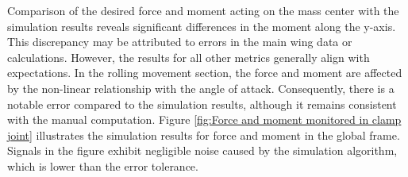 Comparison of the desired force and moment acting on the mass center with the simulation results reveals significant differences in the moment along the y-axis. This discrepancy may be attributed to errors in the main wing data or calculations. However, the results for all other metrics generally align with expectations. In the rolling movement section, the force and moment are affected by the non-linear relationship with the angle of attack. Consequently, there is a notable error compared to the simulation results, although it remains consistent with the manual computation. Figure \ref{fig:Force and moment monitored in clamp joint} illustrates the simulation results for force and moment in the global frame. Signals in the figure exhibit negligible noise caused by the simulation algorithm, which is lower than the error tolerance.

